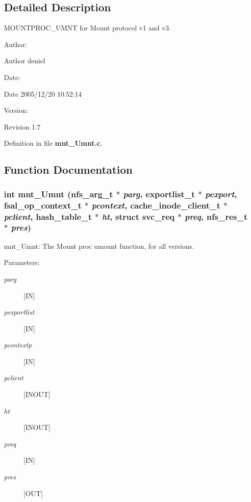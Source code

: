 \subsection{Detailed Description}
MOUNTPROC\_\-UMNT for Mount protocol v1 and v3. 

\begin{Desc}
\item[Author:]\end{Desc}
\begin{Desc}
\item[Author]deniel \end{Desc}
\begin{Desc}
\item[Date:]\end{Desc}
\begin{Desc}
\item[Date]2005/12/20 10:52:14 \end{Desc}
\begin{Desc}
\item[Version:]\end{Desc}
\begin{Desc}
\item[Revision]1.7 \end{Desc}


Definition in file {\bf mnt\_\-Umnt.c}.

\subsection{Function Documentation}
\subsubsection[{mnt\_\-Umnt}]{\setlength{\rightskip}{0pt plus 5cm}int mnt\_\-Umnt (nfs\_\-arg\_\-t $\ast$ {\em parg}, \/  exportlist\_\-t $\ast$ {\em pexport}, \/  fsal\_\-op\_\-context\_\-t $\ast$ {\em pcontext}, \/  cache\_\-inode\_\-client\_\-t $\ast$ {\em pclient}, \/  hash\_\-table\_\-t $\ast$ {\em ht}, \/  struct svc\_\-req $\ast$ {\em preq}, \/  nfs\_\-res\_\-t $\ast$ {\em pres})}\label{mnt__Umnt_8c_3883b1bb2e80705838ca6153f07b0a7f}


mnt\_\-Umnt: The Mount proc umount function, for all versions.

\begin{Desc}
\item[Parameters:]
\begin{description}
\item[{\em parg}][IN] \item[{\em pexportlist}][IN] \item[{\em pcontextp}][IN] \item[{\em pclient}][INOUT] \item[{\em ht}][INOUT] \item[{\em preq}][IN] \item[{\em pres}][OUT] \end{description}
\end{Desc}


